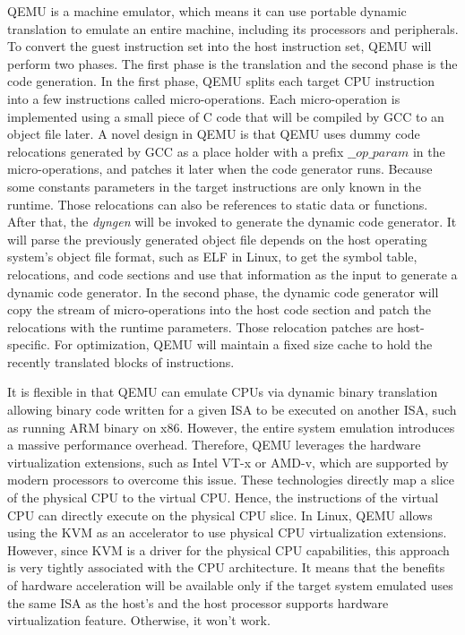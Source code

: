 QEMU is a machine emulator, which means it can use portable dynamic translation to emulate an entire machine, including its processors and peripherals. To convert the guest instruction set into the host instruction set, QEMU will perform two phases. The first phase is the translation and the second phase is the code generation. In the first phase, QEMU splits each target CPU instruction into a few instructions called micro-operations. Each micro-operation is implemented using a small piece of C code that will be compiled by GCC to an object file later. A novel design in QEMU is that QEMU uses dummy code relocations generated by GCC as a place holder with a prefix \emph{$\_\_op\_param$} in the micro-operations, and patches it later when the code generator runs. Because some constants parameters in the target instructions are only known in the runtime. Those relocations can also be references to static data or functions. After that, the \emph{dyngen} will be invoked to generate the dynamic code generator. It will parse the previously generated object file depends on the host operating system's object file format, such as ELF in Linux, to get the symbol table, relocations, and code sections and use that information as the input to generate a dynamic code generator. In the second phase, the dynamic code generator will copy the stream of micro-operations into the host code section and patch the relocations with the runtime parameters. Those relocation patches are host-specific. For optimization, QEMU will maintain a fixed size cache to hold the recently translated blocks of instructions. 

It is flexible in that QEMU can emulate CPUs via dynamic binary translation allowing binary code written for a given ISA to be executed on another ISA, such as running ARM binary on x86. However, the entire system emulation introduces a massive performance overhead. Therefore, QEMU leverages the hardware virtualization extensions,  such as Intel VT-x or AMD-v, which are supported by modern processors to overcome this issue. These technologies directly map a slice of the physical CPU to the virtual CPU. Hence, the instructions of the virtual CPU can directly execute on the physical CPU slice. In Linux, QEMU allows using the KVM as an accelerator to use physical CPU virtualization extensions. However, since KVM is a driver for the physical CPU capabilities, this approach is very tightly associated with the CPU architecture. It means that the benefits of hardware acceleration will be available only if the target system emulated uses the same ISA as the host's and the host processor supports hardware virtualization feature. Otherwise, it won't work.

